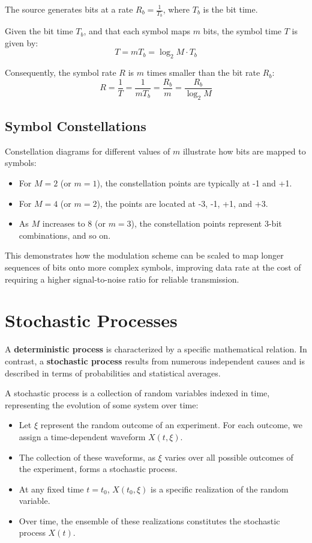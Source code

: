The source generates bits at a rate \( R_b = \frac{1}{T_b} \), where \( T_b \) is the bit time.

Given the bit time \( T_b \), and that each symbol maps \( m \) bits, the symbol time \( T \) is given by:
\[ T = mT_b = \log_2 M \cdot T_b \]

Consequently, the symbol rate \( R \) is \( m \) times smaller than the bit rate \( R_b \):
\[ R = \frac{1}{T} = \frac{1}{mT_b} = \frac{R_b}{m} = \frac{R_b}{\log_2 M} \]

\subsection*{Symbol Constellations}

Constellation diagrams for different values of \( m \) illustrate how bits are mapped to symbols:
\begin{itemize}
    \item For \( M = 2 \) (or \( m = 1 \)), the constellation points are typically at -1 and +1.
    \item For \( M = 4 \) (or \( m = 2 \)), the points are located at -3, -1, +1, and +3.
    \item As \( M \) increases to 8 (or \( m = 3 \)), the constellation points represent 3-bit combinations, and so on.
\end{itemize}
This demonstrates how the modulation scheme can be scaled to map longer sequences of bits onto more complex symbols, improving data rate at the cost of requiring a higher signal-to-noise ratio for reliable transmission.


\section*{Stochastic Processes}

A \textbf{deterministic process} is characterized by a specific mathematical relation. In contrast, a \textbf{stochastic process} results from numerous independent causes and is described in terms of probabilities and statistical averages.

A stochastic process is a collection of random variables indexed in time, representing the evolution of some system over time:
\begin{itemize}
    \item Let \( \xi \) represent the random outcome of an experiment. For each outcome, we assign a time-dependent waveform \( X(t, \xi) \).
    \item The collection of these waveforms, as \( \xi \) varies over all possible outcomes of the experiment, forms a stochastic process.
    \item At any fixed time \( t = t_0 \), \( X(t_0, \xi) \) is a specific realization of the random variable.
    \item Over time, the ensemble of these realizations constitutes the stochastic process \( X(t) \).
\end{itemize}

